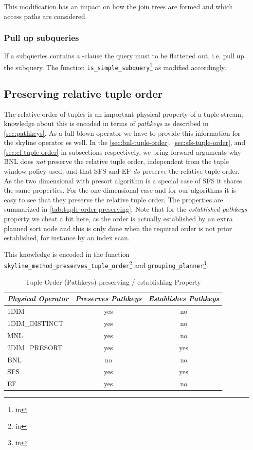 This modification has an impact on how the join trees are formed and
which access paths are considered.

\subsubsection{Pull up subqueries}
If a subqueries contains a -clause the query
must to be flattened out, i.e. pull up the subquery.  The function
\texttt{is\_simple\_subquery}\footnote{in
} as modified
accordingly.

\subsection{Preserving relative tuple order}
\label{sec:relative-tuple-order}
The relative order of tuples is an important physical property of a
tuple stream, knowledge about this is encoded in terms of
\emph{pathkeys} as described in \autoref{sec:pathkeys}. As a
full-blown operator we have to provide this information for the skyline
operator es well.  In the \autoref{sec:bnl-tuple-order},
\ref{sec:sfs-tuple-order}, and \ref{sec:ef-tuple-order} in subsections
respectively, we bring forward arguments why BNL does \emph{not}
preserve the relative tuple order, independent from the tuple window
policy used, and that SFS and EF \emph{do} preserve the relative tuple
order.  As the two dimensional with presort algorithm is a special
case of SFS it shares the same properties.  For the one dimensional
case and for our \naive algorithms it is easy to see that they
preserve the relative tuple order.  The properties are summarized in
\autoref{tab:tuple-order-preserving}. Note that for the
\emph{established pathkeys} property we cheat a bit here, as the order
is actually established by an extra planned sort node and this is only
done when the required order is not prior established, for instance by
an index scan.

This knowledge is encoded in the function
\texttt{skyline\_method\_preserves\_tuple\_order}\footnote{in } and \texttt{grouping\_planner}\footnote{in }.

\begin{table}[htbp]
\centering
\begin{tabular}{lcc}
\emph{Physical Operator} & \emph{Preserves Pathkeys} & \emph{Establishes Pathkeys}\\
\hline
1DIM            & yes & no  \\
1DIM\_DISTINCT  & yes & no  \\
MNL             & yes & no  \\
2DIM\_PRESORT   & yes & yes \\
BNL             & no  & no  \\
SFS             & yes & yes \\
EF              & yes & no  \\
\end{tabular}
\caption{Tuple Order (Pathkeys) preserving / establishing Property}
\label{tab:tuple-order-preserving}
\end{table}


